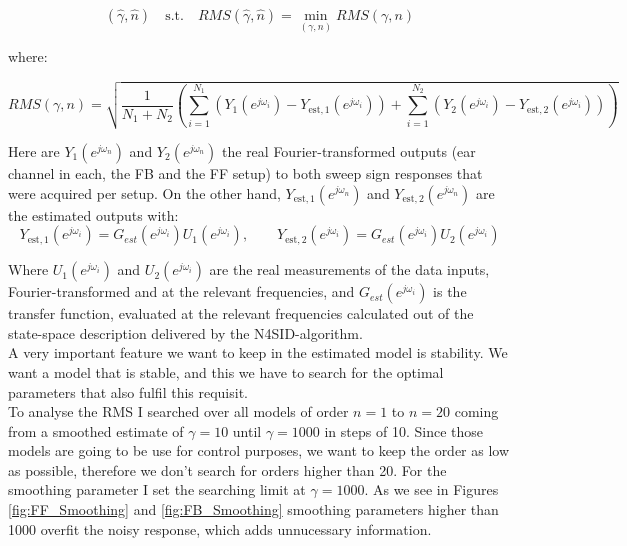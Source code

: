 \[(\hat{\gamma},\hat{n}) \quad\text{s.t.}\quad RMS(\hat{\gamma},\hat{n}) = \min\limits_{(\gamma,n)} RMS(\gamma,n)\]

where:

\[RMS(\gamma,n) = \sqrt{ \frac{1}{N_1 + N_2}\left(\sum\limits_{i=1}^{N_1}(Y_1(e^{j\omega_i})-Y_{\text{est},1}(e^{j\omega_i}))+\sum\limits_{i=1}^{N_2}(Y_2(e^{j\omega_i})-Y_{\text{est},2}(e^{j\omega_i}))\right)}\]

Here are $Y_1(e^{j\omega_n})$ and $Y_2(e^{j\omega_n})$ the real Fourier-transformed outputs (ear channel in each, the FB and the FF setup) to both sweep sign responses that were acquired per setup. On the other hand, $Y_{\text{est},1}(e^{j\omega_n})$ and $Y_{\text{est},2}(e^{j\omega_n})$ are the estimated outputs with:\\

\[Y_{\text{est},1}(e^{j\omega_i}) = G_{est}(e^{j\omega_i})U_1(e^{j\omega_i}), \qquad Y_{\text{est},2}(e^{j\omega_i}) = G_{est}(e^{j\omega_i})U_2(e^{j\omega_i})\]

Where $U_1(e^{j\omega_i})$ and $U_2(e^{j\omega_i})$ are the real measurements of the data inputs, Fourier-transformed and at the relevant frequencies, and $G_{est}(e^{j\omega_i})$ is the transfer function, evaluated at the relevant frequencies calculated out of the state-space description delivered by the N4SID-algorithm.\\

A very important feature we want to keep in the estimated model is stability. We want a model that is stable, and this we have to search for the optimal parameters that also fulfil this requisit.\\

To analyse the RMS I searched over all models of order $n=1$ to $n = 20$ coming from a smoothed estimate of $\gamma = 10$ until $\gamma = 1000$ in steps of 10. Since those models are going to be use for control purposes, we want to keep the order as low as possible, therefore we don't search for orders higher than 20. For the smoothing parameter I set the searching limit at $\gamma = 1000$. As we see in Figures \ref{fig:FF_Smoothing} and \ref{fig:FB_Smoothing} smoothing parameters higher than 1000 overfit the noisy response, which adds unnucessary information. \\

